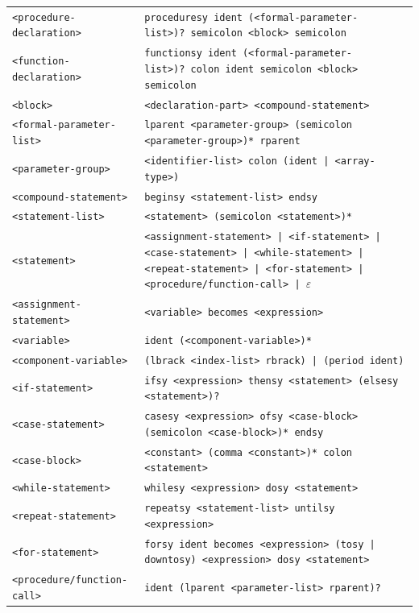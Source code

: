\documentclass[11pt,a4paper]{article}
\begin{document}
\begin{longtable}{l p{12cm}}
\texttt{<procedure-declaration>}  & \texttt{proceduresy ident (<formal-parameter-list>)?\ semicolon <block> semicolon} \\
\texttt{<function-declaration>}   & \texttt{functionsy ident (<formal-parameter-list>)?\ colon ident semicolon <block> semicolon} \\
\texttt{<block>}                  & \texttt{<declaration-part> <compound-statement>} \\
\texttt{<formal-parameter-list>}  & \texttt{lparent <parameter-group> (semicolon <parameter-group>)* rparent} \\
\texttt{<parameter-group>}        & \texttt{<identifier-list> colon (ident | <array-type>)} \\
\texttt{<compound-statement>}     & \texttt{beginsy <statement-list> endsy} \\
\texttt{<statement-list>}         & \texttt{<statement> (semicolon <statement>)*} \\
\texttt{<statement>}              & \texttt{<assignment-statement> | <if-statement> | <case-statement> | <while-statement> | <repeat-statement> | <for-statement> | <procedure/function-call> | $\varepsilon$} \\
\texttt{<assignment-statement>}   & \texttt{<variable> becomes <expression>} \\
\texttt{<variable>}               & \texttt{ident (<component-variable>)*} \\
\texttt{<component-variable>}     & \texttt{(lbrack <index-list> rbrack) | (period ident)} \\
\texttt{<if-statement>}           & \texttt{ifsy <expression> thensy <statement> (elsesy <statement>)?} \\
\texttt{<case-statement>}         & \texttt{casesy <expression> ofsy <case-block> (semicolon <case-block>)* endsy} \\
\texttt{<case-block>}             & \texttt{<constant> (comma <constant>)* colon <statement>} \\
\texttt{<while-statement>}        & \texttt{whilesy <expression> dosy <statement>} \\
\texttt{<repeat-statement>}       & \texttt{repeatsy <statement-list> untilsy <expression>} \\
\texttt{<for-statement>}          & \texttt{forsy ident becomes <expression> (tosy | downtosy) <expression> dosy <statement>} \\
\texttt{<procedure/function-call>}& \texttt{ident (lparent <parameter-list> rparent)?} \\

\end{longtable}
\end{document}

